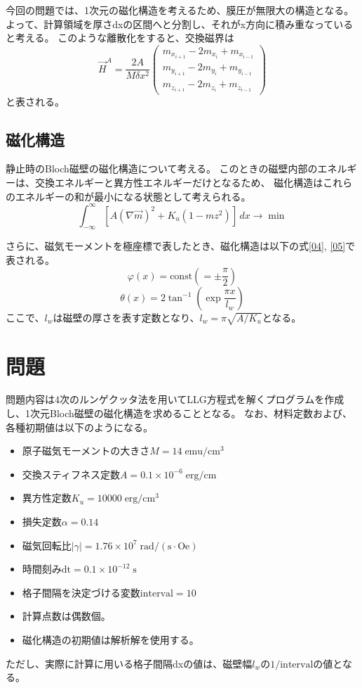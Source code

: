 \documentclass{jsarticle}
\begin{document}
今回の問題では、1次元の磁化構造を考えるため、膜圧が無限大の構造となる。
よって、計算領域を厚さdxの区間へと分割し、それがx方向に積み重なっていると考える。
このような離散化をすると、交換磁界は
\begin{equation}
	\label{03}
	\vec{H}^A = \frac{2A}{M \delta x^2}
	\begin{pmatrix}
		m_{x_{i+1}} - 2m_{x_i} + m_{x_{i-1}}\\
		m_{y_{i+1}} - 2m_{y_i} + m_{y_{i-1}}\\
		m_{z_{i+1}} - 2m_{z_i} + m_{z_{i-1}}
	\end{pmatrix} 
\end{equation}
と表される。

\subsection{磁化構造}
静止時のBloch磁壁の磁化構造について考える。
このときの磁壁内部のエネルギーは、交換エネルギーと異方性エネルギーだけとなるため、
磁化構造はこれらのエネルギーの和が最小になる状態として考えられる。
\begin{equation}
	\int_{-\infty}^{\infty} [A(\nabla\vec{m})^2 + K_u(1-mz^2)] \,dx \rightarrow \min
\end{equation}

さらに、磁気モーメントを極座標で表したとき、磁化構造は以下の式\ref{04}, \ref{05}で表される。
\begin{equation}
	\label{04}
	\varphi(x) = \mathrm{const}(=\pm \frac{\pi}{2})
\end{equation}
\begin{equation}
	\label{05}
	\theta(x) = 2\tan ^{-1} (\exp\frac{\pi x}{l_w})
\end{equation}
ここで、$l_w$は磁壁の厚さを表す定数となり、$l_w=\pi\sqrt{A/K_u}$となる。

\section{問題}
問題内容は4次のルンゲクッタ法を用いてLLG方程式を解くプログラムを作成し、1次元Bloch磁壁の磁化構造を求めることとなる。
なお、材料定数および、各種初期値は以下のようになる。
\begin{itemize}
 \item 原子磁気モーメントの大きさ$M = 14\;\mathrm{emu/cm^3}$
 \item 交換スティフネス定数$A = 0.1\times 10^{-6}\;\mathrm{erg/cm}$
 \item 異方性定数$K_u = 10000\;\mathrm{erg/cm^3}$
 \item 損失定数$\alpha = 0.14$
 \item 磁気回転比$\lvert\gamma\rvert = 1.76\times 10^7\;\mathrm{rad/(s\cdot Oe)}$
 \item 時間刻み$\mathrm{dt} = 0.1\times 10^{-12}\;\mathrm{s}$
 \item 格子間隔を決定づける変数$\mathrm{interval} = 10$
 \item 計算点数は偶数個。
 \item 磁化構造の初期値は解析解を使用する。
\end{itemize}
ただし、実際に計算に用いる格子間隔dxの値は、磁壁幅$l_w$の$1/\mathrm{interval}$の値となる。
\end{document}
